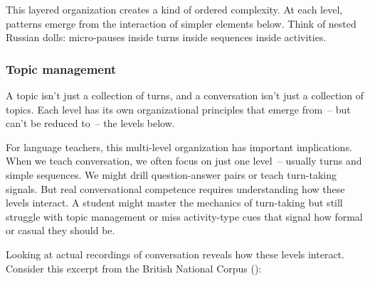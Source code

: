 This layered organization creates a kind of ordered complexity. At each level, patterns emerge from the interaction of simpler elements below. Think of nested Russian dolls: micro-pauses inside turns inside sequences inside activities.

\subsubsection{Topic management}\label{sssec:topic-man}

A topic isn't just a collection of turns, and a conversation isn't just a collection of topics. Each level has its own organizational principles that emerge from~-- but can't be reduced to~-- the levels below.

For language teachers, this multi-level organization has important implications. When we teach conversation, we often focus on just one level~-- usually turns and simple sequences. We might drill question-answer pairs or teach turn-taking signals. But real conversational competence requires understanding how these levels interact. A student might master the mechanics of turn-taking but still struggle with topic management or miss activity-type cues that signal how formal or casual they should be.

Looking at actual recordings of conversation reveals how these levels interact. Consider this excerpt from the British National Corpus (\citeyear{BNC_KC8}):

